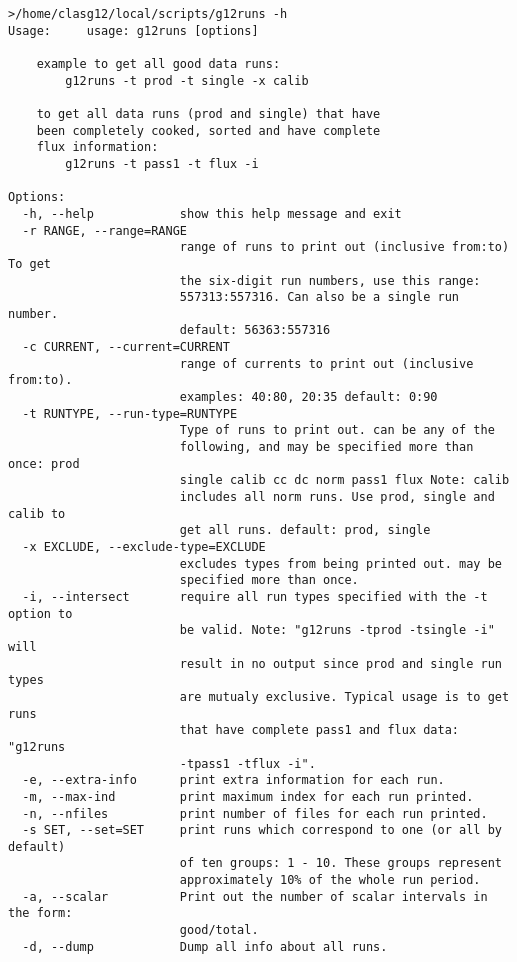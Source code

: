 \begin{verbatim}
>/home/clasg12/local/scripts/g12runs -h
Usage:     usage: g12runs [options]

    example to get all good data runs:
        g12runs -t prod -t single -x calib

    to get all data runs (prod and single) that have
    been completely cooked, sorted and have complete
    flux information:
        g12runs -t pass1 -t flux -i

Options:
  -h, --help            show this help message and exit
  -r RANGE, --range=RANGE
                        range of runs to print out (inclusive from:to) To get
                        the six-digit run numbers, use this range:
                        557313:557316. Can also be a single run number.
                        default: 56363:557316
  -c CURRENT, --current=CURRENT
                        range of currents to print out (inclusive from:to).
                        examples: 40:80, 20:35 default: 0:90
  -t RUNTYPE, --run-type=RUNTYPE
                        Type of runs to print out. can be any of the
                        following, and may be specified more than once: prod
                        single calib cc dc norm pass1 flux Note: calib
                        includes all norm runs. Use prod, single and calib to
                        get all runs. default: prod, single
  -x EXCLUDE, --exclude-type=EXCLUDE
                        excludes types from being printed out. may be
                        specified more than once.
  -i, --intersect       require all run types specified with the -t option to
                        be valid. Note: "g12runs -tprod -tsingle -i" will
                        result in no output since prod and single run types
                        are mutualy exclusive. Typical usage is to get runs
                        that have complete pass1 and flux data: "g12runs
                        -tpass1 -tflux -i".
  -e, --extra-info      print extra information for each run.
  -m, --max-ind         print maximum index for each run printed.
  -n, --nfiles          print number of files for each run printed.
  -s SET, --set=SET     print runs which correspond to one (or all by default)
                        of ten groups: 1 - 10. These groups represent
                        approximately 10% of the whole run period.
  -a, --scalar          Print out the number of scalar intervals in the form:
                        good/total.
  -d, --dump            Dump all info about all runs.
\end{verbatim}
